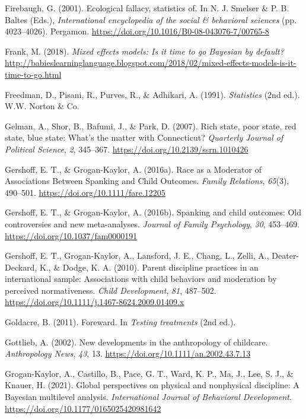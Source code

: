 \documentclass[
  letterpaper,
  DIV=11,
  numbers=noendperiod]{scrreprt}
\newlength{\cslhangindent}
\newenvironment{CSLReferences}[2] %
 {\begin{list}{}{%
  \setlength{\itemindent}{0pt}
  \setlength{\leftmargin}{0pt}
  \setlength{\parsep}{0pt}
  \ifodd #1
   \setlength{\leftmargin}{\cslhangindent}
   \setlength{\itemindent}{-1\cslhangindent}
  \fi
  \setlength{\itemsep}{#2\baselineskip}}}
 {\end{list}}
\begin{document}
\begin{CSLReferences}{1}{0}
Firebaugh, G. (2001). Ecological fallacy, statistics of. In N. J.
Smelser \& P. B. Baltes (Eds.), \emph{International encyclopedia of the
social \& behavioral sciences} (pp. 4023--4026). Pergamon.
\url{https://doi.org/10.1016/B0-08-043076-7/00765-8}

Frank, M. (2018). \emph{Mixed effects models: Is it time to go
{B}ayesian by default?}
\url{http://babieslearninglanguage.blogspot.com/2018/02/mixed-effects-models-is-it-time-to-go.html}

Freedman, D., Pisani, R., Purves, R., \& Adhikari, A. (1991).
\emph{Statistics} (2nd ed.). W.W. Norton \& Co.

Gelman, A., Shor, B., Bafumi, J., \& Park, D. (2007). Rich state, poor
state, red state, blue state: What's the matter with {C}onnecticut?
\emph{Quarterly Journal of Political Science}, \emph{2}, 345--367.
\url{https://doi.org/10.2139/ssrn.1010426}

Gershoff, E. T., \& Grogan-Kaylor, A. (2016a). {Race as a Moderator of
Associations Between Spanking and Child Outcomes}. \emph{Family
Relations}, \emph{65}(3), 490--501.
\url{https://doi.org/10.1111/fare.12205}

Gershoff, E. T., \& Grogan-Kaylor, A. (2016b). Spanking and child
outcomes: Old controversies and new meta-analyses. \emph{Journal of
Family Psychology}, \emph{30}, 453--469.
\url{https://doi.org/10.1037/fam0000191}

Gershoff, E. T., Grogan-Kaylor, A., Lansford, J. E., Chang, L., Zelli,
A., Deater-Deckard, K., \& Dodge, K. A. (2010). Parent discipline
practices in an international sample: Associations with child behaviors
and moderation by perceived normativeness. \emph{Child Development},
\emph{81}, 487--502.
\url{https://doi.org/10.1111/j.1467-8624.2009.01409.x}

Goldacre, B. (2011). {Foreward}. In \emph{Testing treatments} (2nd ed.).

Gottlieb, A. (2002). New developments in the anthropology of childcare.
\emph{Anthropology News}, \emph{43}, 13.
\url{https://doi.org/10.1111/an.2002.43.7.13}

Grogan-Kaylor, A., Castillo, B., Pace, G. T., Ward, K. P., Ma, J., Lee,
S. J., \& Knauer, H. (2021). {Global perspectives on physical and
nonphysical discipline: A {B}ayesian multilevel analysis}.
\emph{International Journal of Behavioral Development}.
\url{https://doi.org/10.1177/0165025420981642}


\end{CSLReferences}
\end{document}
